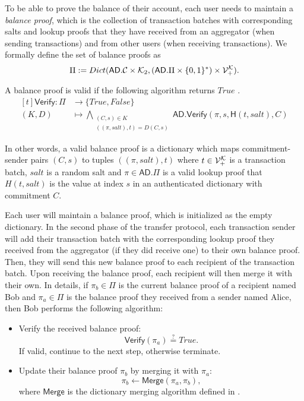 To be able to prove the balance of their account, each user needs to
maintain a \emph{balance proof}, which is the collection of
transaction batches with corresponding salts and lookup proofs that
they have received from an aggregator (when sending transactions) and
from other users (when receiving transactions). We formally define
\href{https://github.com/\repo
FVIntmax/BalanceProof.lean#L27}{\ExternalLink} the set of balance
proofs as \[\Pi := Dict(\mathsf{AD}.\mathcal{C} \times \mathcal{K}_2, (\mathsf{AD}.\Pi
\times \{0,1\}^*) \times \mathcal{V}_+^{\mathcal{K}}).\]

A balance proof is valid if the following algorithm returns \(True\)
\href{https://github.com/\repo FVIntmax/BalanceProof.lean#L60}{\ExternalLink}.
\[
\begin{aligned}[t]
\mathsf{Verify} \colon \Pi & \to \{True,False\}                       \\
(K,D)                      & \mapsto \bigwedge_{\substack{(C,s) \in K
\\ ((\pi,salt), t) = D(C,s)}} \mathsf{AD.Verify}(\pi,s,\mathsf{H}(t,salt),C)
\end{aligned}\]

In other words, a valid balance proof is a dictionary which maps
commitment-sender pairs \((C,s)\) to tuples \(((\pi,salt), t)\) where
\(t \in \mathcal{V}_+^{\mathcal{K}}\) is a transaction batch, \(salt\) is a random salt
and \(\pi \in \mathsf{AD}.\Pi\) is a valid lookup proof that
\(H(t,salt)\) is the value at index \(s\) in an authenticated
dictionary with commitment \(C\).

Each user will maintain a balance proof, which is initialized as the
empty dictionary. In the second phase of the transfer protocol, each
transaction sender will add their transaction batch with the
corresponding lookup proof they received from the aggregator (if they
did receive one) to their own balance proof. Then, they will send
this new balance proof to each recipient of the transaction batch.
Upon receiving the balance proof, each recipient will then merge it
with their own. In details, if \(\pi_b \in \Pi\) is the current
balance proof of a recipient named Bob and \(\pi_a \in \Pi\) is the
balance proof they received from a sender named Alice, then Bob
performs the following algorithm:

\begin{itemize}
\item Verify the received balance proof: \[\mathsf{Verify}(\pi_a)
\stackrel{?}{=} True.\] If valid, continue to the next step,
otherwise terminate.
\item Update their balance proof \(\pi_b\) by merging it with
\(\pi_a\): \[\pi_b \leftarrow \mathsf{Merge}(\pi_a, \pi_b),\] where
\(\mathsf{Merge}\) is the dictionary merging algorithm defined in
.
\end{itemize}

